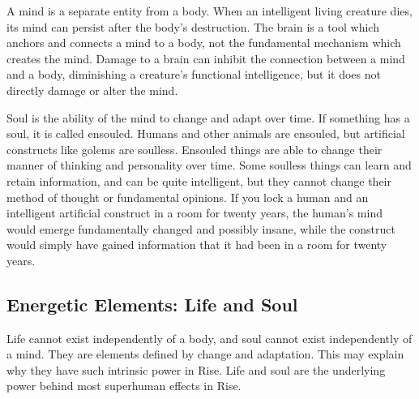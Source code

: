     A mind is a separate entity from a body.
    When an intelligent living creature dies, its mind can persist after the body's destruction.
    The brain is a tool which anchors and connects a mind to a body, not the fundamental mechanism which creates the mind.
    Damage to a brain can inhibit the connection between a mind and a body, diminishing a creature's functional intelligence, but it does not directly damage or alter the mind.

    Soul is the ability of the mind to change and adapt over time.
    If something has a soul, it is called ensouled.
    Humans and other animals are ensouled, but artificial constructs like golems are soulless.
    Ensouled things are able to change their manner of thinking and personality over time.
    Some soulless things can learn and retain information, and can be quite intelligent, but they cannot change their method of thought or fundamental opinions.
    If you lock a human and an intelligent artificial construct in a room for twenty years, the human's mind would emerge fundamentally changed and possibly insane, while the construct would simply have gained information that it had been in a room for twenty years.

  \subsection{Energetic Elements: Life and Soul}
    Life cannot exist independently of a body, and soul cannot exist independently of a mind.
    They are elements defined by change and adaptation.
    This may explain why they have such intrinsic power in Rise.
    Life and soul are the underlying power behind most superhuman effects in Rise.

